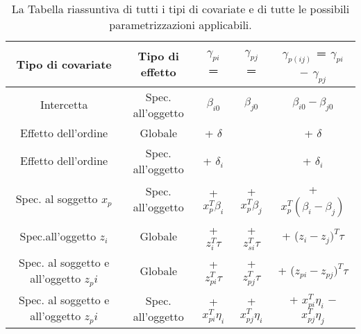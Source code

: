 	\begin{table}[!htb]%
	
	\renewcommand{\arraystretch}{1.7}
	\centering
	\begin{tabular}{c c c c c}
		\hline	
		
		\textbf{Tipo di covariate} & \textbf{Tipo di effetto} & \textbf{$\gamma_{pi}$ =}& \textbf{$\gamma_{pj}$ =} & \textbf{$\gamma_{p(ij)}$ = $\gamma_{pi}$ $-$ $\gamma_{pj}$} \\	
		\hline			
		Intercetta & Spec. all'oggetto & $\beta_{i0}$ & $\beta_{j0}$ & $\beta_{i0} - \beta_{j0}$\\
		Effetto dell'ordine & Globale & + $\delta$ &  & + $\delta$ \\
		Effetto dell'ordine & Spec. all'oggetto &  + $\delta_i$ &  &  + $\delta_i$\\
		Spec. al soggetto $x_p$ & Spec. all'oggetto & + $x^T_p\beta_i$ & + $x^T_p\beta_j$ & + $x^T_p(\beta_i - \beta_j)$\\
		Spec.all'oggetto  $z_i$ & Globale & + $z^T_{i}\tau$ & + $z^T_{si}\tau$ & + ($z_{i} - z_{j})^T\tau$\\
		Spec. al soggetto e all'oggetto $z_pi$ & Globale & + $z^T_{pi}\tau$ & + $z^T_{pj}\tau$ & + ($z_{pi} - z_{pj})^T\tau$\\
		Spec. al soggetto e all'oggetto $z_pi$ & Spec. all'oggetto & + $x^T_{pi}\eta_i$ & + $x^T_{pj}\eta_i$& + $x^T_{pi}\eta_i$ $-$ $x^T_{pj}\eta_j$\\
		\hline
		
		
	\end{tabular} \hbox{}
	
	\caption{La Tabella riassuntiva di tutti i tipi di covariate e di tutte le possibili parametrizzazioni applicabili.} \label{tab:type}
\end{table}

